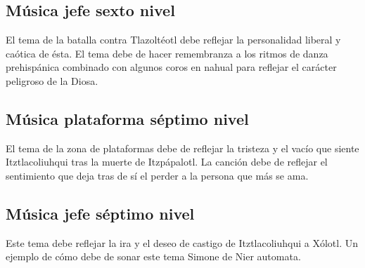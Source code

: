 \subsection{Música jefe sexto nivel} \label{Musica:N06_ZN02}
El tema de la batalla contra Tlazoltéotl debe reflejar la personalidad liberal y caótica de ésta. El tema debe de hacer remembranza a los ritmos de danza prehispánica combinado con algunos coros en nahual para reflejar el carácter peligroso de la Diosa. 

\subsection{Música plataforma séptimo nivel} \label{Musica:N07_ZN01}
El tema de la zona de plataformas debe de reflejar la tristeza y el vacío que siente Itztlacoliuhqui tras la muerte de Itzpápalotl. La canción debe de reflejar el sentimiento que deja tras de sí el perder a la persona que más se ama.

\subsection{Música jefe séptimo nivel} \label{Musica:N07_ZN02}
Este tema debe reflejar la ira y el deseo de castigo de Itztlacoliuhqui a Xólotl. Un  ejemplo de cómo debe de sonar este tema Simone de Nier automata.